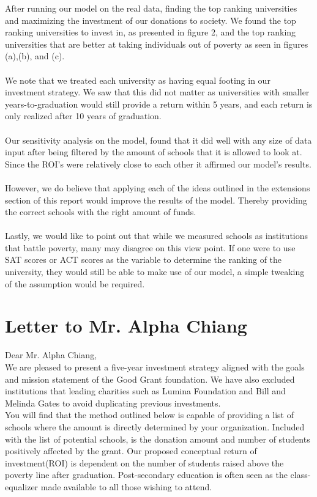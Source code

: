 \documentclass[12pt]{scrartcl}
\begin{document}
	After running our model on the real data, finding the top ranking universities and maximizing the investment of our donations to society. We found the top ranking universities to invest in, as presented in figure 2, and the top ranking universities that are better at taking individuals out of poverty as seen in figures (a),(b), and (c).\\
	\\
	We note that we treated each university as having equal footing in our investment strategy. We saw that this did not matter	as universities with smaller years-to-graduation would still provide a return within 5 years, and each return is only realized after 10 years of graduation.\\
	\\	
	Our sensitivity analysis on the model, found that it did well with any size of data input after being filtered by the amount of schools that it is allowed to look at. Since the ROI's were relatively close to each other it affirmed our model's results.\\
	\\
	However, we do believe that applying each of the ideas outlined in the extensions section of this report would improve the results of the model. Thereby providing the correct schools with the right amount of funds.\\
	\\
	Lastly, we would like to point out that while we measured schools as institutions that battle poverty, many may disagree on this view point. If one were to use SAT scores or ACT scores as the variable to determine the ranking of the university, they would still be able to make use of our model, a simple tweaking of the assumption would be required.
\clearpage

\section{Letter to Mr. Alpha Chiang}
Dear Mr. Alpha Chiang, \\

We are pleased to present a five-year investment strategy aligned with the goals and mission statement of the Good Grant foundation. We have also excluded institutions that leading charities such as Lumina Foundation and Bill and Melinda Gates to avoid duplicating previous investments.\\

You will find that the method outlined below is capable of providing a list of schools where the amount is directly determined by your organization. Included with the list of potential schools, is the donation amount and number of students positively affected by the grant. Our proposed conceptual return of investment(ROI) is dependent on the number of students raised above the poverty line after graduation. Post-secondary education is often seen as the class-equalizer made available to all those wishing to attend. \\
\end{document}
